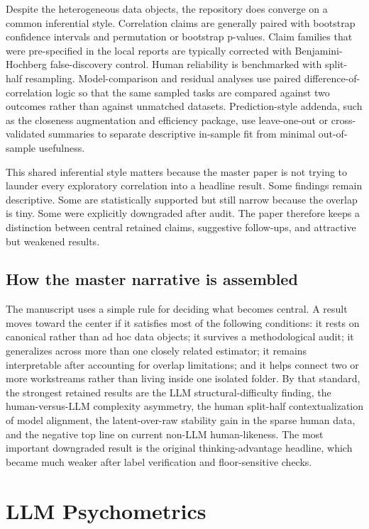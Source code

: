 \documentclass[11pt,letterpaper]{article}
\begin{document}
Despite the heterogeneous data objects, the repository does converge on a common inferential style. Correlation claims are generally paired with bootstrap confidence intervals and permutation or bootstrap p-values. Claim families that were pre-specified in the local reports are typically corrected with Benjamini-Hochberg false-discovery control. Human reliability is benchmarked with split-half resampling. Model-comparison and residual analyses use paired difference-of-correlation logic so that the same sampled tasks are compared against two outcomes rather than against unmatched datasets. Prediction-style addenda, such as the closeness augmentation and efficiency package, use leave-one-out or cross-validated summaries to separate descriptive in-sample fit from minimal out-of-sample usefulness.

This shared inferential style matters because the master paper is not trying to launder every exploratory correlation into a headline result. Some findings remain descriptive. Some are statistically supported but still narrow because the overlap is tiny. Some were explicitly downgraded after audit. The paper therefore keeps a distinction between central retained claims, suggestive follow-ups, and attractive but weakened results.

\subsection{How the master narrative is assembled}

The manuscript uses a simple rule for deciding what becomes central. A result moves toward the center if it satisfies most of the following conditions: it rests on canonical rather than ad hoc data objects; it survives a methodological audit; it generalizes across more than one closely related estimator; it remains interpretable after accounting for overlap limitations; and it helps connect two or more workstreams rather than living inside one isolated folder. By that standard, the strongest retained results are the LLM structural-difficulty finding, the human-versus-LLM complexity asymmetry, the human split-half contextualization of model alignment, the latent-over-raw stability gain in the sparse human data, and the negative top line on current non-LLM human-likeness. The most important downgraded result is the original thinking-advantage headline, which became much weaker after label verification and floor-sensitive checks.

\section{LLM Psychometrics}
\end{document}
